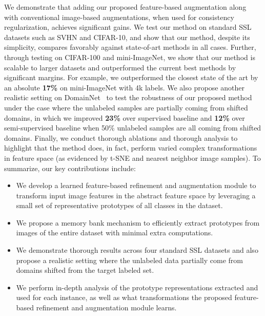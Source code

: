 \documentclass[runningheads]{llncs}
\begin{document}
We demonstrate that adding our proposed feature-based augmentation along with conventional image-based augmentations, when used for consistency regularization, achieves significant gains.
We test our method on standard SSL datasets such as SVHN and CIFAR-10, and show that our method, despite its simplicity, compares favorably against state-of-art methods in all cases.
Further, through testing on CIFAR-100 and mini-ImageNet, we show that our method is scalable to larger datasets and outperformed the current best methods by significant margins.
For example, we outperformed the closest state of the art by an absolute
\textbf{17\%} on mini-ImageNet with 4k labels.
We also propose another realistic setting on DomainNet~\cite{peng2019moment} to test the robustness of our proposed method under the case where the unlabeled samples are partially coming from shifted domains, in which we improved \textbf{23\%} over supervised baseline and \textbf{12\%} over semi-supervised baseline when 50\% unlabeled samples are all coming from shifted domains.
Finally, we conduct thorough ablations and thorough analysis to highlight that the method does, in fact, perform varied complex transformations in feature space (as evidenced by t-SNE and nearest neighbor image samples).
  To summarize, our key contributions include:
\begin{itemize}[topsep=0pt,itemsep=-1ex,partopsep=1ex,parsep=1ex,labelindent=0.0em,labelsep=0.2cm,leftmargin=*]
    \item We develop a learned feature-based refinement and augmentation module to transform input image features in the abstract feature space by leveraging a small set of representative prototypes of all classes in the dataset.
    \item We propose a memory bank mechanism to efficiently extract prototypes from images of the entire dataset with minimal extra computations.
    \item We demonstrate thorough results across four standard SSL datasets and also propose a 
    realistic setting where the unlabeled data partially come from domains shifted from the target labeled set.
    \item We perform in-depth analysis of the prototype representations extracted and used for each instance, as well as what transformations the proposed feature-based refinement and augmentation module learns.
\end{itemize}
  
\end{document}
